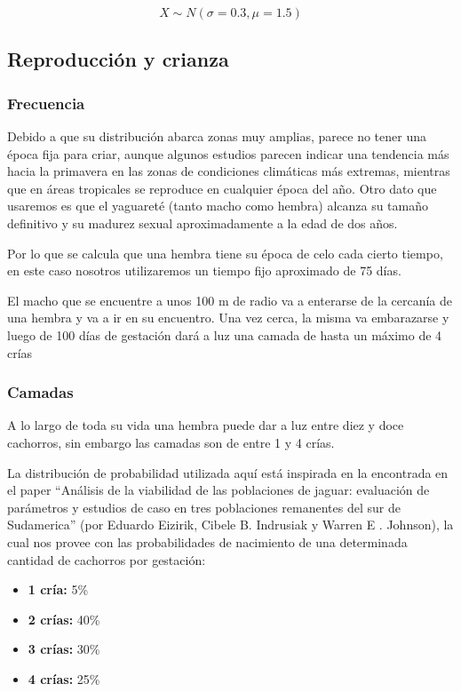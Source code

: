     \begin{equation}
        X \sim N(\sigma=0.3, \mu=1.5)
    \end{equation}
    
    \subsection{Reproducción y crianza}
    
        \subsubsection{Frecuencia}
            Debido a que su distribución abarca zonas muy amplias, parece no tener una época fija para criar, aunque algunos estudios parecen indicar una tendencia más hacia la primavera en las zonas de condiciones climáticas más extremas, mientras que en áreas tropicales se reproduce en cualquier época del año. Otro dato que usaremos es que el yaguareté (tanto macho como hembra) alcanza su tamaño definitivo y su madurez sexual aproximadamente a la edad de dos años.
            
            Por lo que se calcula que una hembra tiene su época de celo cada cierto tiempo, en este caso nosotros utilizaremos un tiempo fijo aproximado de 75 días.
            
            El macho que se encuentre a unos 100 m de radio va a enterarse de la cercanía de una hembra y va a ir en su encuentro. Una vez cerca, la misma va embarazarse y luego de 100 días de gestación dará a luz una camada de hasta un máximo de 4 crías
        
        \subsubsection{Camadas}
            A lo largo de toda su vida una hembra puede dar a luz entre diez y doce cachorros, sin embargo las camadas son de entre 1 y 4 crías.
            
            La distribución de probabilidad utilizada aquí está inspirada en la encontrada en el paper “Análisis de la viabilidad de las poblaciones de jaguar: evaluación de parámetros y estudios de caso en tres poblaciones remanentes del sur de Sudamerica” (por Eduardo Eizirik, Cibele B. Indrusiak y Warren E . Johnson), la cual nos provee con las probabilidades de nacimiento de una determinada cantidad de cachorros por gestación:

            \begin{itemize}
                \item \textbf{1 cría:} 5\%
                \item \textbf{2 crías:} 40\%
                \item \textbf{3 crías:} 30\%
                \item \textbf{4 crías:} 25\%
            \end{itemize}

